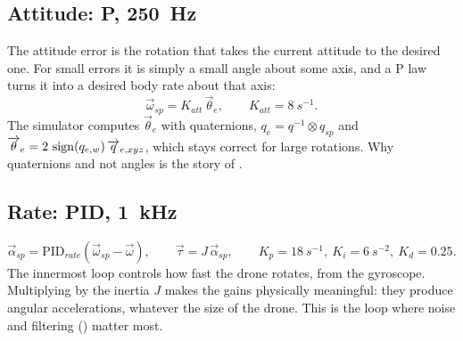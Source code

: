 \subsection{Attitude: P, \SI{250}{Hz}}
The attitude error is the rotation that takes the current attitude to the desired one. For small errors it is simply a small angle about some axis, and a P law turns it into a desired body rate about that axis:
\begin{equation}
  \vec\omega_{sp} = K_{att}\,\vec\theta_e, \qquad K_{att} = \SI{8}{s^{-1}} .
\end{equation}
The simulator computes $\vec\theta_e$ with quaternions, $q_e = q^{-1}\otimes q_{sp}$ and $\overrightarrow{\theta}_e = 2\,\operatorname{sign}(q_{e,w})\,\overrightarrow{q}_{e,xyz}$, which stays correct for large rotations. Why quaternions and not angles is the story of .

\subsection{Rate: PID, \SI{1}{kHz}}
\begin{equation}
  \vec\alpha_{sp} = \mathrm{PID}_{rate}(\vec\omega_{sp} - \vec\omega),\qquad \vec\tau = J\,\vec\alpha_{sp}, \qquad K_p = \SI{18}{s^{-1}},\ K_i = \SI{6}{s^{-2}},\ K_d = 0.25 .
\end{equation}
The innermost loop controls how fast the drone rotates, from the gyroscope. Multiplying by the inertia $J$ makes the gains physically meaningful: they produce angular accelerations, whatever the size of the drone. This is the loop where noise and filtering () matter most.

